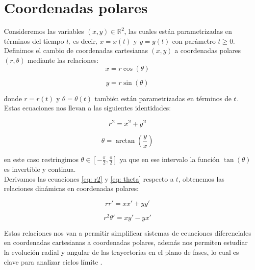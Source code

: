 \section{Coordenadas polares}

Consideremos las variables $(x,y)\in\mathbb{R}^2$, las cuales están parametrizadas en términos del tiempo $t$, es decir, $x=x(t)$ y $y=y(t)$ con parámetro $t\geq0$. Definimos el cambio de coordenadas cartesianas $(x,y)$
a coordenadas polares $(r,\theta)$ mediante las relaciones:
\begin{equation}\label{eq: xpolar}
	x=r\cos(\theta)
\end{equation}

\begin{equation}\label{eq: ypolar}
	y=r\sin(\theta)
\end{equation}

donde $r=r(t)$ y $\theta=\theta(t)$ también están parametrizadas en términos de $t$.\\

Estas ecuaciones nos llevan a las siguientes identidades:

\begin{equation}\label{eq: r2}
	r^2=x^2+y^2\\
\end{equation}

\begin{equation}\label{eq: theta}
	\theta=\arctan{\left(\frac{y}{x}\right)}
\end{equation}

en este caso restringimos $\theta\in\left[-\frac{\pi}{2},\frac{\pi}{2}\right]$ ya que en ese intervalo la función $\tan\left(\theta\right)$ es invertible y continua.\\

Derivamos las ecuaciones \eqref{eq: r2} y \eqref{eq: theta} respecto a $t$, obtenemos las relaciones dinámicas en coordenadas polares:

\begin{equation}\label{eq: drcart}
	rr'=xx'+yy'
\end{equation}

\begin{equation}\label{eq: dthetacart}
	r^2\theta'=xy'-yx'
\end{equation}

Estas relaciones nos van a permitir simplificar sistemas de ecuaciones diferenciales en coordenadas cartesianas a coordenadas polares, además nos permiten estudiar la evolución radial y angular de las trayectorias en el plano de fases, lo cual es clave para analizar ciclos límite \cite{perko2001differential}.\\

